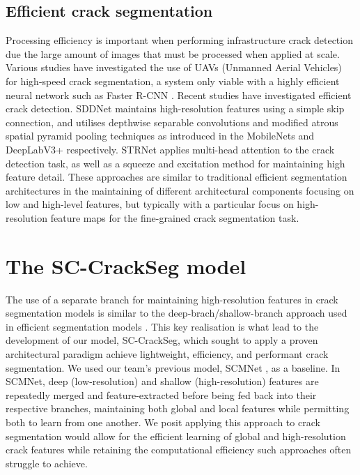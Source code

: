\documentclass[a4paper,12pt]{report}
\begin{document}
\subsection{Efficient crack segmentation}
Processing efficiency is important when performing infrastructure crack detection due the large amount of images that must be processed when applied at scale. Various studies \cite{kerle_uav-based_2020} \cite{kang_autonomous_2018} have investigated the use of UAVs (Unmanned Aerial Vehicles) for high-speed crack segmentation, a system only viable with a highly efficient neural network such as Faster R-CNN \cite{ali_real-time_2021}. Recent studies have investigated efficient crack detection. SDDNet \cite{choi_sddnet_2019} maintains high-resolution features using a simple skip connection, and utilises depthwise separable convolutions and modified atrous spatial pyramid pooling techniques as introduced in the MobileNets \cite{howard_mobilenets_2017} and DeepLabV3+ \cite{chen_rethinking_2017} respectively. STRNet \cite{kang_efficient_2021} applies multi-head attention to the crack detection task, as well as a squeeze and excitation method for maintaining high feature detail.
These approaches are similar to traditional efficient segmentation architectures in the maintaining of different architectural components focusing on low and high-level features, but typically with a particular focus on high-resolution feature maps for the fine-grained crack segmentation task.

\section{The SC-CrackSeg model}

The use of a separate branch for maintaining high-resolution features in crack segmentation models \cite{nayyeri_multi-resolution_2021} is similar to the deep-brach/shallow-branch approach used in efficient segmentation models \cite{yu_bisenet_2018} \cite{poudel_contextnet_2018}. This key realisation is what lead to the development of our model, SC-CrackSeg, which sought to apply a proven architectural paradigm achieve lightweight, efficiency, and performant crack segmentation. We used our team's previous model, SCMNet \cite{singha_scmnet_2021}, as a baseline. In SCMNet, deep (low-resolution) and shallow (high-resolution) features are repeatedly merged and feature-extracted before being fed back into their respective branches, maintaining both global and local features while permitting both to learn from one another. We posit applying this approach to crack segmentation would allow for the efficient learning of global and high-resolution crack features while retaining the computational efficiency such approaches often struggle to achieve.
\end{document}
